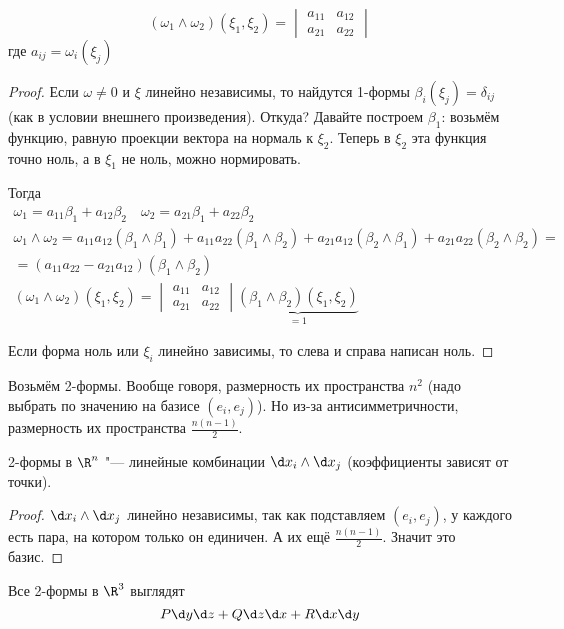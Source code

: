 \begin{theorem}
	\[ (\omega_1 \wedge \omega_2)(\xi_1, \xi_2) = \begin{vmatrix} a_{11} & a_{12} \\ a_{21} & a_{22} \end{vmatrix} \]
	где $a_{ij} = \omega_i(\xi_j)$
\end{theorem}
\begin{proof}
	Если $\omega \ne 0$ и $\xi$ линейно независимы, то найдутся 1-формы $\beta_i(\xi_j) = \delta_{ij}$ (как в условии внешнего произведения).
	Откуда?
	Давайте построем $\beta_1$: возьмём функцию, равную проекции вектора на нормаль к $\xi_2$.
	Теперь в $\xi_2$ эта функция точно ноль, а в $\xi_1$ не ноль, можно нормировать.

	Тогда
	\begin{gather*}
		\omega_1 = a_{11} \beta_1 + a_{12} \beta_2 \quad \omega_2 = a_{21} \beta_1 + a_{22} \beta_2 \\
		\omega_1 \wedge \omega_2
		= a_{11} a_{12} (\beta_1 \wedge \beta_1)
		+ a_{11} a_{22} (\beta_1 \wedge \beta_2)
		+ a_{21} a_{12} (\beta_2 \wedge \beta_1)
		+ a_{21} a_{22} (\beta_2 \wedge \beta_2) = \\
		= (a_{11} a_{22} - a_{21} a_{12}) (\beta_1 \wedge \beta_2) \\
		(\omega_1 \wedge \omega_2) (\xi_1, \xi_2)
		= \begin{vmatrix} a_{11} & a_{12} \\ a_{21} & a_{22} \end{vmatrix} \underbrace{(\beta_1 \wedge \beta_2) (\xi_1, \xi_2)}_{=1}
	\end{gather*}

	Если форма ноль или $\xi_i$ линейно зависимы, то слева и справа написан ноль.
\end{proof}

\begin{Rem}
	Возьмём 2-формы.
	Вообще говоря, размерность их пространства $n^2$ (надо выбрать по значению на базисе $(e_i, e_j)$).
	Но из-за антисимметричности, размерность их пространства $\frac{n(n-1)}2$.
\end{Rem}

\begin{theorem}
	2-формы в $\R^n$ "--- линейные комбинации $\d x_i \wedge \d x_j$ (коэффициенты зависят от точки).
\end{theorem}
\begin{proof}
	$\d x_i \wedge \d x_j$ линейно независимы, так как подставляем $(e_i, e_j)$, у каждого есть пара, на котором только он единичен.
	А их ещё $\frac{n(n-1)}2$.
	Значит это базис.
\end{proof}

\begin{conseq}
	Все 2-формы в $\R^3$ выглядят
	\[ P \d y \d z + Q \d z \d x + R \d x \d y \]
\end{conseq}
